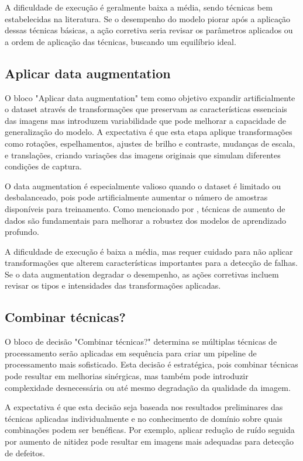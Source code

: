 A dificuldade de execução é geralmente baixa a média, sendo técnicas bem estabelecidas na literatura. Se o desempenho do modelo piorar após a aplicação dessas técnicas básicas, a ação corretiva seria revisar os parâmetros aplicados ou a ordem de aplicação das técnicas, buscando um equilíbrio ideal.

\subsection{Aplicar data augmentation}
O bloco "Aplicar data augmentation" tem como objetivo expandir artificialmente o dataset através de transformações que preservam as características essenciais das imagens mas introduzem variabilidade que pode melhorar a capacidade de generalização do modelo. A expectativa é que esta etapa aplique transformações como rotações, espelhamentos, ajustes de brilho e contraste, mudanças de escala, e translações, criando variações das imagens originais que simulam diferentes condições de captura.

O data augmentation é especialmente valioso quando o dataset é limitado ou desbalanceado, pois pode artificialmente aumentar o número de amostras disponíveis para treinamento. Como mencionado por , técnicas de aumento de dados são fundamentais para melhorar a robustez dos modelos de aprendizado profundo.

A dificuldade de execução é baixa a média, mas requer cuidado para não aplicar transformações que alterem características importantes para a detecção de falhas. Se o data augmentation degradar o desempenho, as ações corretivas incluem revisar os tipos e intensidades das transformações aplicadas.

\subsection{Combinar técnicas?}
O bloco de decisão "Combinar técnicas?" determina se múltiplas técnicas de processamento serão aplicadas em sequência para criar um pipeline de processamento mais sofisticado. Esta decisão é estratégica, pois combinar técnicas pode resultar em melhorias sinérgicas, mas também pode introduzir complexidade desnecessária ou até mesmo degradação da qualidade da imagem.

A expectativa é que esta decisão seja baseada nos resultados preliminares das técnicas aplicadas individualmente e no conhecimento de domínio sobre quais combinações podem ser benéficas. Por exemplo, aplicar redução de ruído seguida por aumento de nitidez pode resultar em imagens mais adequadas para detecção de defeitos.

